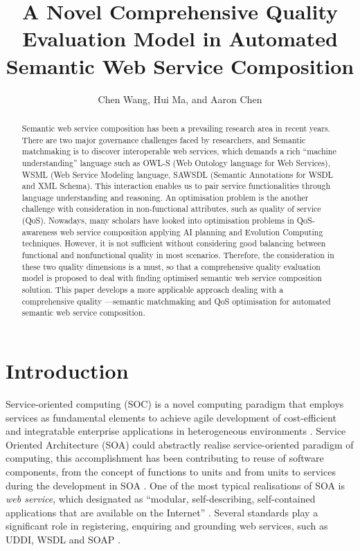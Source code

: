 \documentclass{llncs}
\title{A Novel Comprehensive Quality Evaluation Model in Automated Semantic Web Service Composition}
\author{Chen Wang, Hui Ma, and Aaron Chen}
\institute{School of Engineering and Computer Science,
\\Victoria University of Wellington, New Zealand \\
\email{\{Chen.Wang, Hui.Ma, and Aaron.Chen\}@ecs.vuw.ac.nz }}
\begin{document}
\maketitle

\begin{abstract}
Semantic web service composition has been a prevailing research area in recent years. There are two major governance challenges faced by researchers, and Semantic matchmaking is to discover interoperable web services, which demands a rich “machine understanding” language such as OWL-S (Web Ontology language for Web Services), WSML (Web Service Modeling language, SAWSDL (Semantic Annotations for WSDL and XML Schema). This interaction enables us to pair service functionalities through language understanding and reasoning. An optimisation problem is the another challenge with consideration in non-functional attributes, such as quality of service (QoS). Nowadays, many scholars have looked into optimisation problems in QoS-awareness web service composition applying AI planning and Evolution Computing techniques. However, it is not sufficient without considering good balancing between functional and nonfunctional quality in most scenarios. Therefore, the consideration in these two quality dimensions is a must, so that a comprehensive quality evaluation model is proposed to deal with finding optimised semantic web service composition solution. This paper develops a more applicable approach dealing with a comprehensive quality ---semantic matchmaking and QoS optimisation for automated semantic web service composition.
\end{abstract}

\section{Introduction}\label{introduction}
Service-oriented computing (SOC) is a novel computing paradigm that employs services as fundamental elements to achieve agile development of cost-efficient and integratable enterprise applications in heterogeneous environments \cite{papazoglou2003service}. Service Oriented Architecture (SOA) could abstractly realise service-oriented paradigm of computing, this accomplishment has been contributing to reuse of software components, from the concept of functions to units and from units to services during the development in SOA \cite{booth2004web}. One of the most typical realisations of SOA is \textit{web service}, which designated as ``modular, self-describing, self-contained applications that are available on the Internet'' \cite{curbera2001web}. Several standards play a significant role in registering, enquiring and grounding web services, such as UDDI, WSDL and SOAP \cite{fensel2011semantic}.
\end{document}

